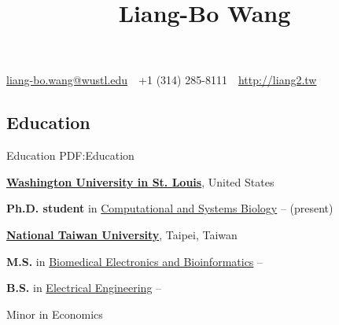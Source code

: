 \documentclass[a4paper,12pt,oneside]{article}
\begin{document}

\title{Liang-Bo Wang}

\begin{subtitle}
\href{mailto:liang-bo.wang@wustl.edu}
{liang-bo.wang@wustl.edu}
\,\BulletSymbol\,
+1 (314) 285-8111
\,\BulletSymbol\,
\href{http://liang2.tw}
{http://liang2.tw}
\end{subtitle}

\begin{body}


\section
{Education}
{Education}
{PDF:Education}


\href{https://wustl.edu/}
{\textbf{Washington University in St. Louis}},
United States
\par
\textbf{Ph.D. student} in
\href{http://dbbs.wustl.edu/divprograms/compbio/Pages/default.aspx}
{Computational and Systems Biology}
\hfill
{} --
(present)

\BigEntryGap

\href{http://www.ntu.edu.tw/english/index.html}
{\textbf{National Taiwan University}},
Taipei, Taiwan
\par
\textbf{M.S.} in
\href{http://www.bebi.ntu.edu.tw/English/index.html}
{Biomedical Electronics and Bioinformatics}
\hfill
{} --


\EntryGapNoBreak
\textbf{B.S.} in
\href{http://www.ee.ntu.edu.tw/en/}
{Electrical Engineering}
\hfill
{} --
\begin{detail}
    \begin{detailitem}
    \item Minor in Economics
    \end{detailitem}
\end{detail}


\end{body}
\end{document}
